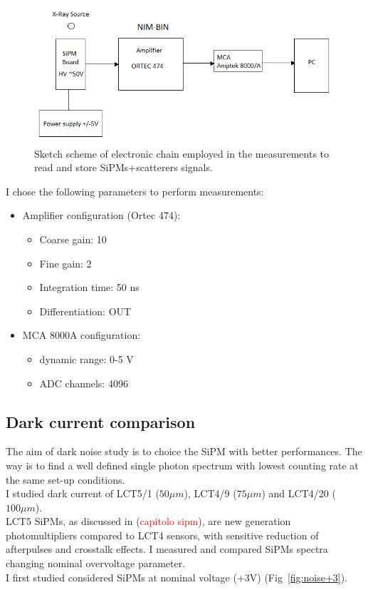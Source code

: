 \documentclass[10pt,a4paper, openany]{book}
\begin{document}
\begin{figure}[!h]
\begin{center}
\includegraphics[scale=0.6]{imm/chain2.png}
\end{center}
\caption{Sketch scheme of electronic chain employed in the measurements to read and store SiPMs+scatterers signals.} 
\label{fig:chain2}
\end{figure}

I chose the following parameters to perform measurements:
\begin{itemize}
\item Amplifier configuration (Ortec 474):
\begin{itemize}
\item Coarse gain: 10
\item Fine gain: 2
\item Integration time: 50 ns
\item Differentiation: OUT
\end{itemize}
\item MCA 8000A configuration:
\begin{itemize}
\item dynamic range: 0-5 V
\item ADC channels: 4096
\end{itemize}
\end{itemize}

\subsection{Dark current comparison}

The aim of dark noise study is to choice the SiPM with better performances. The way is to find a well defined single photon spectrum with lowest counting rate at the same set-up conditions.\\
I studied dark current of LCT5/1 ($50\mu m$), LCT4/9 ($75\mu m$) and LCT4/20 ($100\mu m$).\\
LCT5 SiPMs, as discussed in (\textcolor{red}{capitolo sipm}), are new generation photomultipliers compared to LCT4 sensors, with sensitive reduction of afterpulses and crosstalk effects.
\newpage
I measured and compared SiPMs spectra changing nominal overvoltage parameter.\\
I first studied considered SiPMs at nominal voltage (+3V) (Fig~\ref{fig:noise+3}).
\end{document}
